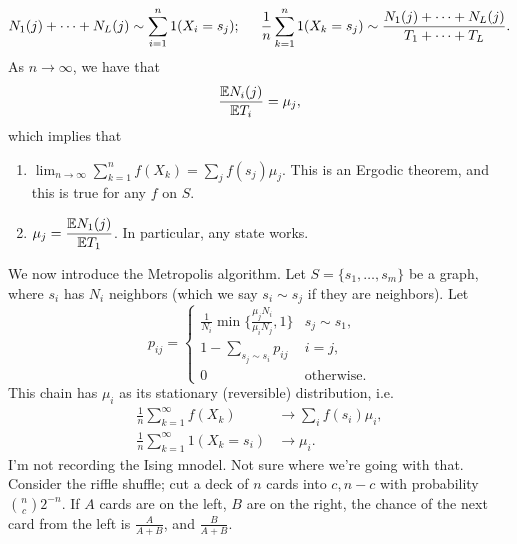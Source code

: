 \[ N_1(j) + \dots + N_L(j) \sim \sum_{i=1}^n 1(X_i = s_j); \hspace{0.2in} \frac{1}{n} \sum_{k=1}^n 1(X_k = s_j) \sim \frac{N_1(j) + \dots + N_L(j)}{T_1 + \dots + T_L}. \]
As $n \to \infty$, we have that
\[ \frac{\mathbb E N_i(j)}{\mathbb E T_i} = \mu_j, \]
which implies that
\begin{enumerate}[label=(\roman*)]
    \item $\lim_{n \to \infty} \sum_{k=1}^n f(X_k) = \sum_j f(s_j) \mu_j$. This is an Ergodic theorem, and this is true for any $f$ on $S$.
    \item $\mu_j = \dfrac{\mathbb E N_1(j)}{\mathbb E T_1}$. In particular, any state works.
\end{enumerate}

\newpage
\noindent We now introduce the Metropolis algorithm. Let $S = \{s_1, \dots, s_m\}$ be a graph, where $s_i$ has $N_i$ neighbors (which we say $s_i \sim s_j$ if they are neighbors). Let
\[ p_{ij} = \begin{cases} \frac{1}{N_i} \min\{\frac{\mu_j N_i}{\mu_i N_j}, 1\} & s_j \sim s_1, \\ 1 - \sum_{s_j \sim s_i} p_{ij} & i = j, \\ 0 & \text{otherwise.} \end{cases} \]
This chain has $\mu_i$ as its stationary (reversible) distribution, i.e.
\begin{align*}
    \frac{1}{n} \sum_{k=1}^\infty f(X_k) &\to \sum_{i} f(s_i) \mu_i, \\
    \frac{1}{n} \sum_{k=1}^\infty 1(X_k = s_i) &\to \mu_i.
\end{align*}
I'm not recording the Ising mnodel. Not sure where we're going with that.
\medskip\newline
Consider the riffle shuffle; cut a deck of $n$ cards into $c, n-c$ with probability $\binom{n}{c} 2^{-n}$. If $A$ cards are on the left,  $B$ are on the right, the chance of the next card from the left is $\frac{A}{A + B}$, and $\frac{B}{A + B}$. 